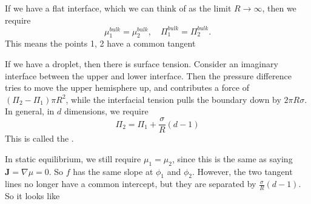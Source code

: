 \documentclass[a4paper]{article}
\begin{document}
If we have a flat interface, which we can think of as the limit $R \to \infty$, then we require
\[
  \mu_1^{bulk} = \mu_2^{bulk},\quad \Pi_1^{bulk} = \Pi_2^{bulk}.
\]
This means the points 1, 2 have a common tangent
\begin{center}
\end{center}

If we have a droplet, then there is surface tension. Consider an imaginary interface between the upper and lower interface. Then the pressure difference tries to move the upper hemisphere up, and contributes a force of $(\Pi_2 - \Pi_1) \pi R^2$, while the interfacial tension pulls the boundary down by $2\pi R \sigma$. In general, in $d$ dimensions, we require
\[
  \Pi_2 = \Pi_1 + \frac{\sigma}{R}(d - 1)
\]
This is called the .

In static equilibrium, we still require $\mu_1 = \mu_2$, since this is the same as saying $\mathbf{J} = \nabla \mu = 0$. So $f$ has the same slope at $\phi_1$ and $\phi_2$. However, the two tangent lines no longer have a common intercept, but they are separated by $\frac{\sigma}{R}(d - 1)$. So it looks like
\begin{center}
\end{center}
\end{document}
